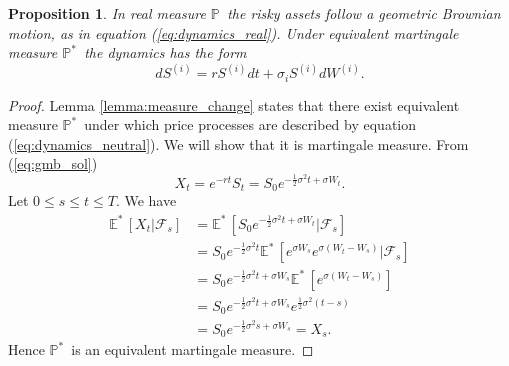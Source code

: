 \documentclass[a4paper,12pt, oneside]{book}
\newtheorem{prop}[thm]{Proposition}
\theoremstyle{definition}
\theoremstyle{remark}
\def\P{{\mathbb{P}}\,}
\def\Em{{\mathbb{E}^*}\,}
\def\Pm{{\mathbb{P}}^*\,}
\begin{document}
\begin{prop}
\label{prop:rn-dynamics}
 In real measure $\P$ the risky assets follow a geometric Brownian motion, as in equation (\ref{eq:dynamics_real}). Under equivalent martingale measure $\Pm$ the dynamics has the form
 \begin{equation}
  \label{eq:dynamics_neutral}
  dS^{(i)} = r S^{(i)} dt + \sigma_i S^{(i)} dW^{(i)}.
 \end{equation}
\end{prop}
\begin{proof}
 Lemma \ref{lemma:measure_change} states that there exist equivalent measure $\Pm$ under which price processes are described by equation (\ref{eq:dynamics_neutral}). We will show that it is martingale measure.
 From (\ref{eq:gmb_sol})
 \[ X_t = e^{-rt} S_t = S_0 e^{ -\frac{1}{2}\sigma^2 t + \sigma W_t }. \]
 Let $0 \leq s \leq t \leq T$. We have
 \begin{equation*}
  \begin{split}
   \Em[X_t | \mathcal{F}_s] &= \Em[ S_0 e^{ -\frac{1}{2}\sigma^2 t + \sigma W_t } | \mathcal{F}_s] \\
       &= S_0 e^{-\frac{1}{2}\sigma^2 t} \Em[ e^{  \sigma W_s} e^{ \sigma (W_t - W_s) } | \mathcal{F}_s] \\
       &= S_0 e^{-\frac{1}{2}\sigma^2 t + \sigma W_s} \Em[ e^{ \sigma (W_t - W_s) }] \\
       &= S_0 e^{-\frac{1}{2}\sigma^2 t + \sigma W_s}  e^{ \frac{1}{2}\sigma^2(t-s) } \\
       &= S_0 e^{-\frac{1}{2}\sigma^2 s + \sigma W_s} = X_s.
  \end{split}
 \end{equation*}
Hence $\Pm$ is an equivalent martingale measure.
\end{proof}
\end{document}

